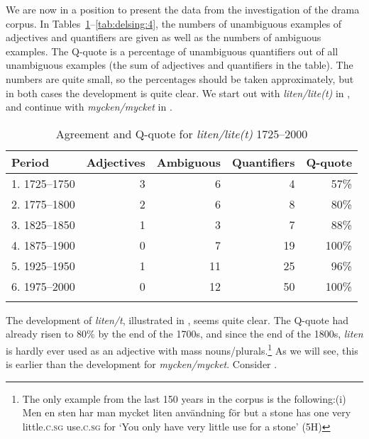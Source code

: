 \documentclass[output=paper]{langscibook}
\begin{document}
We are now in a position to present the data from the investigation of the drama corpus. In Tables~\ref{tab:delsing:3}--\ref{tab:delsing:4}, the numbers of unambiguous examples of adjectives and quantifiers are given as well as the numbers of ambiguous examples. The Q-quote is a percentage of unambiguous quantifiers out of all unambiguous examples (the sum of adjectives and quantifiers in the table). The numbers are quite small, so the percentages should be taken approximately, but in both cases the development is quite clear. We start out with \textit{liten/lite(t)} in , and continue with \textit{mycken/mycket} in .



\begin{table}
\caption{Agreement and Q-quote for \textit{liten/lite(t)} 1725–2000}
\label{tab:delsing:3}
\begin{tabular}{lrrrr}
\lsptoprule
Period & Adjectives & Ambiguous & Quantifiers & Q-quote\\\midrule
1. 1725–1750 & 3 & 6 & 4 & 57\%\\
2. 1775–1800 & 2 & 6 & 8 & 80\%\\
3. 1825–1850 & 1 & 3 & 7 & 88\%\\
4. 1875–1900 & 0 & 7 & 19 & 100\%\\
5. 1925–1950 & 1 & 11 & 25 & 96\%\\
6. 1975–2000 & 0 & 12 & 50 & 100\%\\
\lspbottomrule
\end{tabular}
\end{table}

The development of \textit{liten/t}, illustrated in , seems quite clear. The Q-quote had already risen to 80\% by the end of the 1700s, and since the end of the 1800s, \textit{liten} is hardly ever used as an adjective with mass nouns/plurals.\footnote{The only example from the last 150 years in the corpus is the following:(i)  Men     en     sten     har   man   mycket   liten       användning   för but     a     stone   has   one   very     little\textsc{.c.sg}   use\textsc{.c.sg}     for ‘You only have very little use for a stone’ (5H)} As we will see, this is earlier than the development for \textit{mycken/mycket}. Consider .
\end{document}

